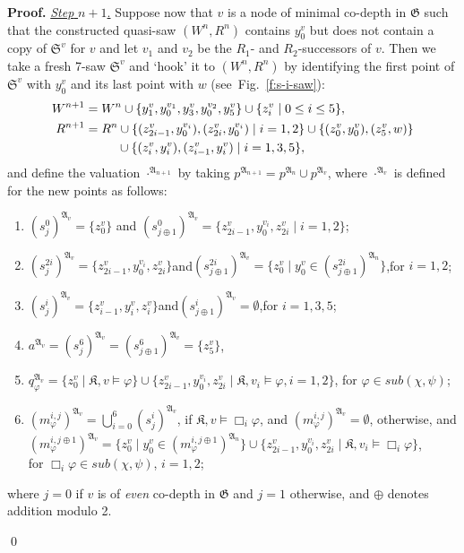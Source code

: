 \documentclass{LMCS}
\renewenvironment{proof}{\par\noindent\textbf{Proof.}}{\mbox{}\qed\par\medskip}
\theoremstyle{plain}
\begin{document}
\begin{proof}
\underline{\emph{Step} $n+1$.} Suppose now that $v$ is a node of
minimal co-depth in $\mathfrak G$ such that the constructed
quasi-saw $(W^n,R^n)$ contains $y_0^v$ but does not contain a
copy of $\mathfrak S^v$ for $v$ and let $v_1$ and $v_2$ be the $R_1$- and
$R_2$-successors of $v$. Then we take a fresh 7-saw $\mathfrak S^v$
and `hook' it to $(W^n,R^n)$ by identifying the first point of
$\mathfrak S^v$ with $y_0^v$ and its last point with $w$
(see~Fig.~\ref{f:s-i-saw}):
\begin{align*}
W^{n+1} & =  W^n \cup \{ y_1^v, y_0^{v_1}, y_3^v, y_0^{v_2}, y_5^v\}\cup \{z_i^v \mid 0 \leq i \leq 5 \},\\
\notag{} R^{n+1} & = R^n \cup \{ (z_{2i-1}^v,y_0^{v_i}), (z_{2i}^v,y_0^{v_i}) \mid i = 1,2\} \cup \{ (z_0^v,y_0^v), (z_5^v,w)  \}\\
& \hspace*{2.6em} \cup \{ (z_i^v,y_i^v), (z_{i-1}^v,y_i^v) \mid i = 1,3,5 \},
\end{align*}
and define the valuation $\cdot^{\mathfrak{A}_{n+1}}$ by taking
$p^{\mathfrak{A}_{n+1}} = p^{\mathfrak{A}_n} \cup
p^{\mathfrak{A}_v}$, where $\cdot^{\mathfrak{A}_v}$ is defined for
the new points as follows:
\begin{enumerate}[$\bullet$]
\item $(s_j^0)^{{\mathfrak A}_v} = \{ z_0^v \}$ \quad and \quad $(s_{j\oplus 1}^0)^{{\mathfrak A}_v} = \{ z_{2i-1}^v, y_0^{v_i}, z_{2i}^v \mid i = 1,2  \}$;
\item $(s_j^{2i})^{{\mathfrak A}_v} = \{ z_{2i-1}^v,y_0^{v_i},z_{2i}^v
\}$\quad and\quad $(s_{j\oplus 1}^{2i})^{{\mathfrak A}_v} = \{
 z_0^v \mid y_0^v \in (s^{2i}_{j \oplus
 1})^{\mathfrak{A}_n}\}$,\quad for $i = 1,2$;
\item $(s_j^i)^{{\mathfrak A}_v} = \{ z_{i-1}^v,y_i^v,z_i^v \}$\quad and\quad $(s_{j\oplus 1}^i)^{{\mathfrak A}_v} =
\emptyset$,\quad for $i = 1,3,5$;
\item $a^{\mathfrak{A}_v} = (s_j^6)^{\mathfrak{A}_v} = (s_{j\oplus 1}^6)^{\mathfrak{A}_v} = \{ z_5^v \}$,
\item $q_{\varphi}^{{\mathfrak A}_v} = \bigl\{ z_0^v \mid \mathfrak K,v \models \varphi\bigr\} \cup \bigl\{ z_{2i-1}^v, y_0^{v_i}, z_{2i}^v \mid \mathfrak K,v_i \models \varphi, i = 1, 2\bigr\}$, for $\varphi \in \mathit{sub}(\chi,\psi)$;
\item $(m^{i,j}_{\varphi})^{{\mathfrak A}_v} = \bigcup_{i = 0}^6 (s_j^i)^{{\mathfrak
A}_v}$,
if $\mathfrak K,v \models \Box_i\varphi$, and $(m^{i,j}_{\varphi})^{{\mathfrak A}_v} = \emptyset$, otherwise, \quad
and\\[6pt]
$(m^{i,j\oplus 1}_{\varphi})^{{\mathfrak A}_v} = \bigl\{z_0^v \mid
y_0^v \in (m^{i,j\oplus 1}_{\varphi})^{{\mathfrak A}_n} \bigr\} \cup
\bigl\{ z_{2i-1}^v,y_0^{v_i},z_{2i}^v \mid \mathfrak K,v_i \models
\Box_i\varphi\bigr\}$,\\[6pt] for $\Box_i\varphi \in
\mathit{sub}(\chi,\psi)$, $i=1,2$;
\end{enumerate}
where $j = 0$ if $v$ is of \emph{even} co-depth in $\mathfrak G$ and
$j = 1$ otherwise, and $\oplus$ denotes addition modulo 2.


\end{proof}
\end{document}
